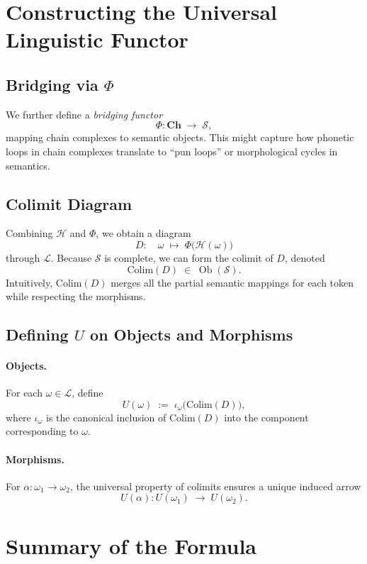\documentclass[11pt]{article}
\theoremstyle{definition}
\theoremstyle{remark}
\begin{document}
\section{Constructing the Universal Linguistic Functor}
\label{sec:ulf_construction}

\subsection{Bridging via \(\Phi\)}
We further define a \emph{bridging functor}
\[
\Phi : \mathbf{Ch} \;\longrightarrow\;\mathcal{S},
\]
mapping chain complexes to semantic objects. This might capture how phonetic loops in chain complexes translate to ``pun loops'' or morphological cycles in semantics.

\subsection{Colimit Diagram}

Combining \(\mathcal{H}\) and \(\Phi\), we obtain a diagram
\[
D: \quad \omega \;\mapsto\; \Phi\bigl(\mathcal{H}(\omega)\bigr)
\]
through \(\mathcal{L}\). Because \(\mathcal{S}\) is complete, we can form the colimit of \(D\), denoted
\[
\mathrm{Colim}(D) \;\in\;\operatorname{Ob}(\mathcal{S}).
\]
Intuitively, \(\mathrm{Colim}(D)\) merges all the partial semantic mappings for each token while respecting the morphisms.

\subsection{Defining \(U\) on Objects and Morphisms}

\paragraph{Objects.} For each \(\omega\in \mathcal{L}\), define
\[
U(\omega) \;:=\; \iota_\omega\bigl(\mathrm{Colim}(D)\bigr),
\]
where \(\iota_\omega\) is the canonical inclusion of \(\mathrm{Colim}(D)\) into the component corresponding to \(\omega\).

\paragraph{Morphisms.} For \(\alpha:\omega_1\to \omega_2\), the universal property of colimits ensures a unique induced arrow
\[
U(\alpha): U(\omega_1)\;\longrightarrow\;U(\omega_2).
\]

\section{Summary of the Formula}
\label{sec:summary_formula}
\end{document}
